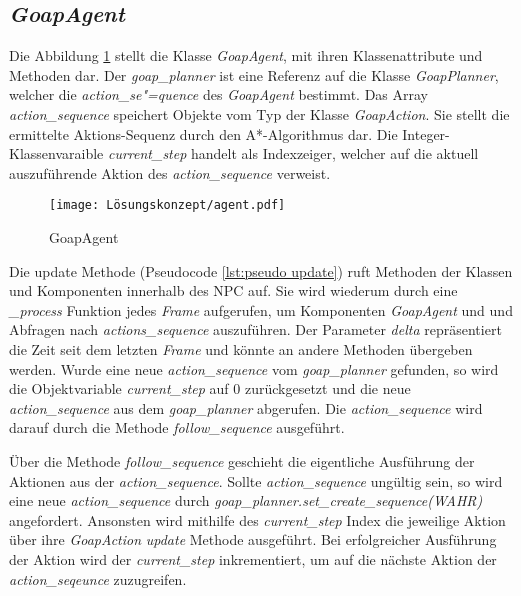 \subsection{\textit{GoapAgent}}
\label{chap:goapagent uml}

Die Abbildung \ref{fig:GoapAgent} stellt die Klasse \textit{GoapAgent}, mit ihren Klassenattribute und Methoden dar. Der \textit{goap\_planner} ist eine Referenz auf die Klasse \textit{GoapPlanner}, welcher die \textit{action\_se"=quence} des \textit{GoapAgent} bestimmt. Das Array \textit{action\_sequence} speichert Objekte vom Typ der Klasse \textit{GoapAction}. Sie stellt die ermittelte Aktions-Sequenz durch den A*-Algorithmus dar. Die Integer-Klassenvaraible \textit{current\_step} handelt als Indexzeiger, welcher auf die aktuell auszuführende Aktion des \textit{action\_sequence} verweist.


\begin{figure}[h]
  \centering
  \texttt{[image: Lösungskonzept/agent.pdf]}
	\captionsetup{justification=justified, format=plain}
  \caption{GoapAgent}
  \label{fig:GoapAgent}
\end{figure}

Die update Methode (Pseudocode \ref{lst:pseudo update}) ruft Methoden der Klassen und Komponenten innerhalb des NPC auf. Sie wird wiederum durch eine \textit{\_process} Funktion jedes \textit{Frame} aufgerufen, um Komponenten \textit{GoapAgent} und und Abfragen nach \textit{actions\_sequence} auszuführen. Der Parameter \textit{delta} repräsentiert die Zeit seit dem letzten \textit{Frame} und könnte an andere Methoden übergeben werden. Wurde eine neue \textit{action\_sequence} vom \textit{goap\_planner} gefunden, so wird die Objektvariable \textit{current\_step} auf $0$ zurückgesetzt und die neue \textit{action\_sequence} aus dem \textit{goap\_planner} abgerufen. Die \textit{action\_sequence} wird darauf durch die Methode \textit{follow\_sequence} ausgeführt.

\"{U}ber die Methode \textit{follow\_sequence} geschieht die eigentliche Ausführung der Aktionen aus der \textit{action\_sequence}. Sollte \textit{action\_sequence} ungültig sein, so wird eine neue \textit{action\_sequence} durch \textit{goap\_planner.set\_create\_sequence(WAHR)} angefordert. Ansonsten wird mithilfe des \textit{current\_step} Index die jeweilige Aktion über ihre \textit{GoapAction} \textit{update} Methode ausgeführt. Bei erfolgreicher Ausführung der Aktion wird der \textit{current\_step} inkrementiert, um auf die nächste Aktion der \textit{action\_seqeunce} zuzugreifen.


